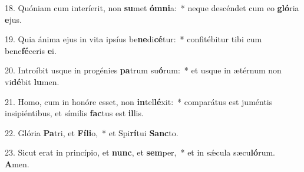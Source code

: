 18. Quóniam cum interíerit, non \textbf{su}met \textbf{óm}\textbf{ni}a:~*  neque descéndet cum eo \textbf{gló}ria \textbf{e}jus.\

19. Quia ánima ejus in vita ipsíus be\textbf{ne}di\textbf{cé}tur:~*  confitébitur tibi cum bene\textbf{fé}ceris \textbf{e}i.\

20. Introíbit usque in progénies \textbf{pa}trum su\textbf{ó}rum:~*  et usque in ætérnum non vi\textbf{dé}bit \textbf{lu}men.\

21. Homo, cum in honóre esset, non \textbf{in}tel\textbf{lé}xit:~*  comparátus est juméntis insipiéntibus, et símilis \textbf{fac}tus est \textbf{il}lis.\

22. Glória \textbf{Pa}tri, et \textbf{Fí}\textbf{li}o,~*  et Spi\textbf{rí}tui \textbf{Sanc}to.\

23. Sicut erat in princípio, et \textbf{nunc}, et \textbf{sem}per,~*  et in sǽcula sæcu\textbf{ló}rum. \textbf{A}men.\

